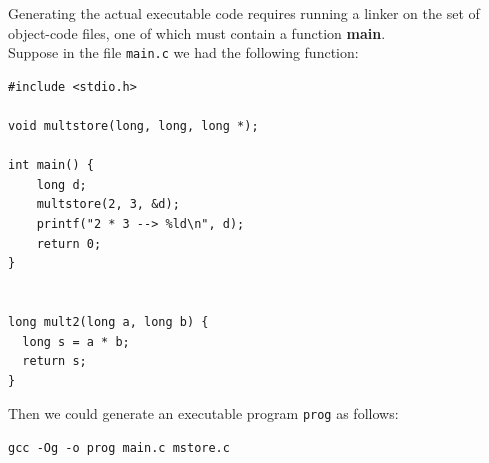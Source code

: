 \documentclass[11pt]{article}
\begin{document}
Generating the actual executable code requires running a linker on the set of object-code files, one of which must contain a function \textbf{main}.\\


Suppose in the file \texttt{main.c} we had the following function:\\
\begin{verbatim}
#include <stdio.h>

void multstore(long, long, long *);

int main() {
    long d;
    multstore(2, 3, &d);
    printf("2 * 3 --> %ld\n", d);
    return 0;
}


long mult2(long a, long b) {
  long s = a * b;
  return s;
}
\end{verbatim}

Then we could generate an executable program \texttt{prog} as follows:\\
\begin{verbatim}
gcc -Og -o prog main.c mstore.c
\end{verbatim}
\end{document}
